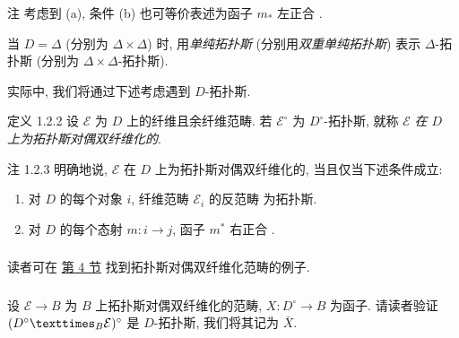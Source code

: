 \begin{enonce*}[remark]{注}
考虑到 (a), 条件 (b) 也可等价表述为函子 $m_{\ast}$ 左正合
.
\end{enonce*}

当 $D = \Delta$ (分别为 $\Delta \times \Delta$) 时,
用\emph{单纯拓扑斯} (分别用\emph{双重单纯拓扑斯})
表示 $\Delta$-拓扑斯 (分别为 $\Delta \times \Delta$-拓扑斯).

实际中, 我们将通过下述考虑遇到 $D$-拓扑斯.

\begin{enonce*}{定义 1.2.2}
设\pageoriginale{} $\mathcal{E}$ 为 $D$ 上的纤维且余纤维范畴.
若 $\mathcal{E}^{\circ}$ 为 $D^{\circ}$-拓扑斯,
就称 $\mathcal{E}$ \emph{在 $D$ 上为拓扑斯对偶双纤维化的}.
\end{enonce*}

\hypertarget{sga4.exp.Vbis.remark.1.2.3}{}\begin{enonce*}[remark]{注 1.2.3}
明确地说, $\mathcal{E}$ 在 $D$ 上为拓扑斯对偶双纤维化的,
当且仅当下述条件成立:
\begin{enumerate}
\renewcommand{\theenumi}{\alph{enumi}}
\renewcommand{\labelenumi}{(\theenumi)}
\item 对 $D$ 的每个对象 $i$, 纤维范畴 $\mathcal{E}_i$ 的反范畴
 为拓扑斯.

\item 对 $D$ 的每个态射 $m : i \to j$, 函子 $m^{\ast}$ 右正合
.
\end{enumerate}
\end{enonce*}

\setcounter{subsection}{2}
\setcounter{subsubsection}{3}
\subsubsection{}
读者可在 \hyperref[Vbis.sec4]{第 4 节} 找到拓扑斯对偶双纤维化范畴的例子.

\subsubsection{}
设 $\mathcal{E} \to B$ 为 $B$ 上拓扑斯对偶双纤维化的范畴,
$X : D^{\circ} \to B$ 为函子.
请读者验证 $(\fprod{D^{\circ}}{\mathcal{E}}{B})^{\circ}$ 是 $D$-拓扑斯,
我们将其记为 $\bar{X}$.

